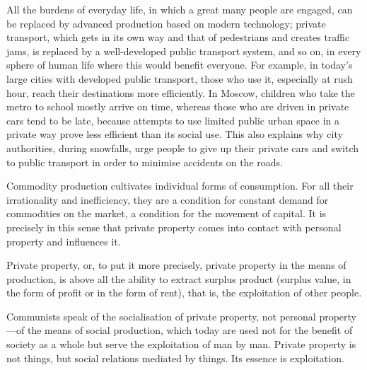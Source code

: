 \documentclass[12pt,a4paper,openany]{book}
\begin{document}
All the burdens of everyday life, in which a great many people are engaged, can be replaced by advanced production based on modern technology; private transport, which gets in its own way and that of pedestrians and creates traffic jams, is replaced by a well-developed public transport system, and so on, in every sphere of human life where this would benefit everyone. For example, in today's large cities with developed public transport, those who use it, especially at rush hour, reach their destinations more efficiently. In Moscow, children who take the metro to school mostly arrive on time, whereas those who are driven in private cars tend to be late, because attempts to use limited public urban space in a private way prove less efficient than its social use. This also explains why city authorities, during snowfalls, urge people to give up their private cars and switch to public transport in order to minimise accidents on the roads.

Commodity production cultivates individual forms of consumption. For all their irrationality and inefficiency, they are a condition for constant demand for commodities on the market, a condition for the movement of capital. It is precisely in this sense that private property comes into contact with personal property and influences it.

Private property, or, to put it more precisely, private property in the means of production, is above all the ability to extract surplus product (surplus value, in the form of profit or in the form of rent), that is, the exploitation of other people.

Communists speak of the socialisation of private property, not personal property—of the means of social production, which today are used not for the benefit of society as a whole but serve the exploitation of man by man. Private property is not things, but social relations mediated by things. Its essence is exploitation.
\end{document}
